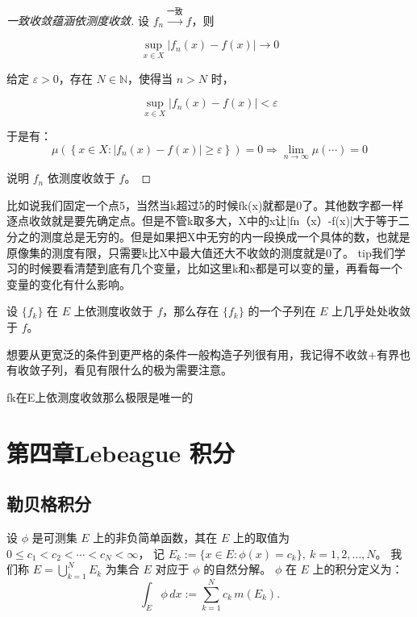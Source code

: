 \documentclass[lang=cn,10pt]{elegantbook}
\begin{document}
\begin{proof}[一致收敛蕴涵依测度收敛]
设 $f_n \overset{\text{一致}}{\longrightarrow} f$，则

\[
\sup_{x \in X} |f_n(x) - f(x)| \to 0
\]

给定 $\varepsilon > 0$，存在 $N \in \mathbb{N}$，使得当 $n > N$ 时，

\[
\sup_{x \in X} |f_n(x) - f(x)| < \varepsilon
\]

于是有：
\[
\mu\left(\left\{x \in X : |f_n(x) - f(x)| \ge \varepsilon \right\} \right) = 0
\Rightarrow \lim_{n \to \infty} \mu(\cdots) = 0
\]

说明 $f_n$ 依测度收敛于 $f$。
\end{proof}
\begin{dxtips}
    

比如说我们固定一个点5，当然当k超过5的时候fk(x)就都是0了。其他数字都一样逐点收敛就是要先确定点。但是不管k取多大，X中的x让|fn（x）-f(x)|大于等于二分之的测度总是无穷的。但是如果把X中无穷的内一段换成一个具体的数，也就是原像集的测度有限，只需要k比X中最大值还大不收敛的测度就是0了。
tip我们学习的时候要看清楚到底有几个变量，比如这里k和x都是可以变的量，再看每一个变量的变化有什么影响。
\end{dxtips}
\begin{theorem}[Riesz 定理]
设 $\{f_k\}$ 在 $E$ 上依测度收敛于 $f$，那么存在 $\{f_k\}$ 的一个子列在 $E$ 上几乎处处收敛于 $f$。
\end{theorem}
想要从更宽泛的条件到更严格的条件一般构造子列很有用，我记得不收敛+有界也有收敛子列，看见有限什么的极为需要注意。
\begin{corollary}[依测度收敛的极限的唯一性]
    {fk}在E上依测度收敛那么极限是唯一的
\end{corollary}
\chapter{第四章Lebeague 积分}
\section{勒贝格积分}
\begin{definition}[简单函数积分的定义]
设 $\phi$ 是可测集 $E$ 上的非负简单函数，其在 $E$ 上的取值为 $0 \leq c_1 < c_2 < \cdots < c_N < \infty$，  
记 $E_k := \{x \in E : \phi(x) = c_k\},\ k = 1, 2, \dots, N$。  
我们称 $E = \bigcup_{k=1}^{N} E_k$ 为集合 $E$ 对应于 $\phi$ 的自然分解。  
$\phi$ 在 $E$ 上的积分定义为：
\[
\int_E \phi\, dx := \sum_{k=1}^N c_k\, m(E_k).
\]
\end{definition}
\end{document}
